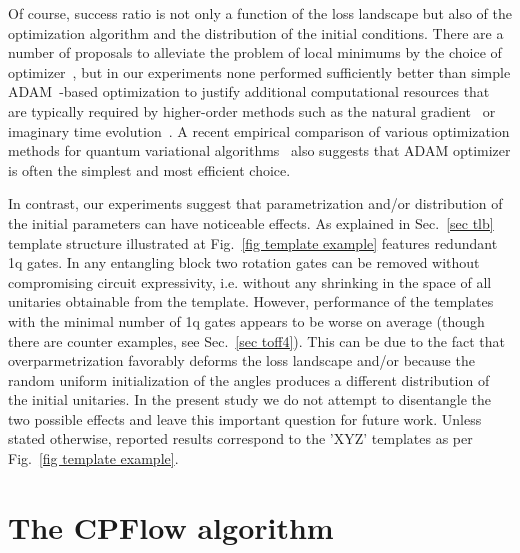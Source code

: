 \documentclass[draft, twocolumn, amsfonts, amssymb, aps, nofootinbib]{revtex4-2}
\begin{document}
Of course, success ratio is not only a function of the loss landscape but also of the optimization algorithm and the distribution of the initial conditions. There are a number of proposals to alleviate the problem of local minimums by the choice of optimizer~\cite{Wierichs2020, Rivera-Dean2021}, but in our experiments none performed sufficiently better than simple ADAM~\cite{Kingma2015}-based optimization to justify additional computational resources that are typically required by higher-order methods such as the natural gradient~\cite{Stokes2020} or imaginary time evolution~\cite{Jones2018a}. A recent empirical comparison of various optimization methods for quantum variational algorithms~\cite{Lockwood2022} also suggests that ADAM optimizer is often the simplest and most efficient choice.

In contrast, our experiments suggest that parametrization and/or distribution of the initial parameters can have noticeable effects. As explained in Sec.~\ref{sec tlb} template structure illustrated at Fig.~\ref{fig template example} features redundant 1q gates. In any entangling block two rotation gates can be removed without compromising circuit expressivity, i.e. without any shrinking in the space of all unitaries obtainable from the template. However, performance of the templates with the minimal number of 1q gates appears to be worse on average (though there are counter examples, see Sec.~\ref{sec toff4}). This can be due to the fact that overparmetrization favorably deforms the loss landscape and/or because the random uniform initialization of the angles produces a different distribution of the initial unitaries. In the present study we do not attempt to disentangle the two possible effects and leave this important question for future work. Unless stated otherwise, reported results correspond to the 'XYZ' templates as per Fig.~\ref{fig template example}.


\section{The CPFlow algorithm \label{sec cpflow}}
\end{document}
